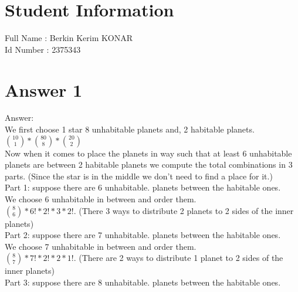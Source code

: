 \documentclass[11pt]{article}
\begin{document}
\section*{Student Information } 
Full Name : Berkin Kerim KONAR \\
Id Number : 2375343 \\

\section*{Answer 1}

Answer:\\

    We first choose 1 star 8 unhabitable planets and, 2 habitable planets.\\
    
    $\binom{10}{1} * \binom{80}{8} * \binom{20}{2}$\\
    
    Now  when it comes to place the planets in way such that at least 6 unhabitable planets are between 2 habitable planets we compute the total combinations in 3 parts. (Since the star is in the middle we don't need to find a place for it.)\\
    
    Part 1: suppose there are 6 unhabitable. planets between the habitable ones.\\
    
    We choose 6 unhabitable in between and order them.\\
    
    $\binom{8}{6}*6!*2!*3*2!$. (There 3 ways to distribute 2 planets to 2 sides of the inner planets)\\
    
    Part 2: suppose there are 7 unhabitable. planets between the habitable ones.\\
    
    We choose 7 unhabitable in between and order them.\\
    
    $\binom{8}{7}*7!*2!*2*1!$. (There are 2 ways to distribute 1 planet to 2 sides of the inner planets)\\
    
    Part 3: suppose there are 8 unhabitable. planets between the habitable ones.
    
\end{document}
